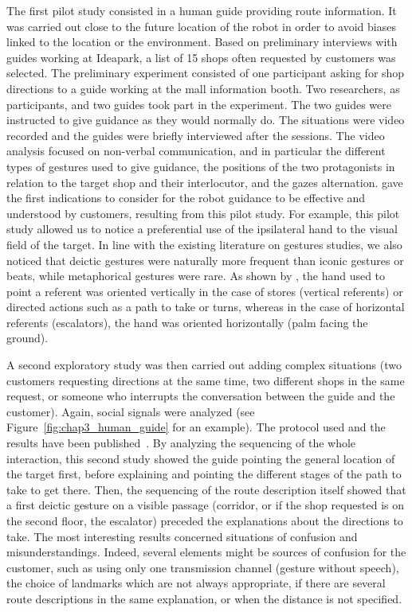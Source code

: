 \documentclass[a4paper,11pt,twoside]{StyleThese}
\begin{document}
The first pilot study consisted in a human guide providing route information. It was carried out close to the future location of the robot in order to avoid biases linked to the location or the environment. Based on preliminary interviews with guides working at Ideapark, a list of 15 shops often requested by customers was selected. The preliminary experiment consisted of one participant asking for shop directions to a guide working at the mall information booth. Two researchers, as participants, and two guides took part in the experiment. The two guides were instructed to give guidance as they would normally do. The situations were video recorded and the guides were briefly interviewed after the sessions. The video analysis focused on non-verbal communication, and in particular the different types of gestures used to give guidance, the positions of the two protagonists in relation to the target shop and their interlocutor, and the gazes alternation. \cite{belhassein_2017_human} gave the first indications to consider for the robot guidance to be effective and understood by customers, resulting from this pilot study. For example, this pilot study allowed us to notice a preferential use of the ipsilateral hand to the visual field of the target. In line with the existing literature on gestures studies, we also noticed that deictic gestures were naturally more frequent than iconic gestures or beats, while metaphorical gestures were rare. As shown by \cite{allen_2003}, the hand used to point a referent was oriented vertically in the case of stores (vertical referents) or directed actions such as a path to take or turns, whereas in the case of horizontal referents (\eg escalators), the hand was oriented horizontally (palm facing the ground).

A second exploratory study was then carried out adding complex situations (\eg two customers requesting directions at the same time, two different shops in the same request, or someone who interrupts the conversation between the guide and the customer). Again, social signals were analyzed (see Figure~\ref{fig:chap3_human_guide} for an example). The protocol used and the results have been published~\citep{heikkilae_2018_where,heikkilae_2019_should}. By analyzing the sequencing of the whole interaction, this second study showed the guide pointing the general location of the target first, before explaining and pointing the different stages of the path to take to get there. Then, the sequencing of the route description itself showed that a first deictic gesture on a visible passage (corridor, or if the shop requested is on the second floor, the escalator) preceded the explanations about the directions to take. The most interesting results concerned situations of confusion and misunderstandings. Indeed, several elements might be sources of confusion for the customer, such as using only one transmission channel (\eg gesture without speech), the choice of landmarks which are not always appropriate, if there are several route descriptions in the same explanation, or when the distance is not specified. 
\end{document}
